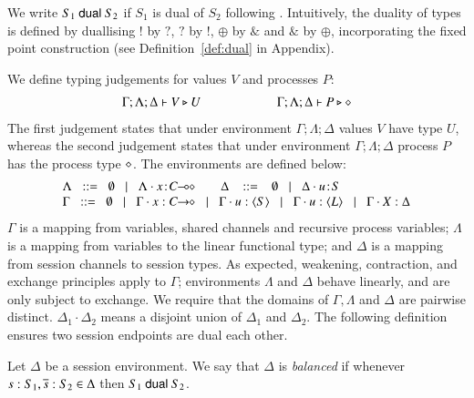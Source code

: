 We write $S_1 \ \mathsf{dual}\  S_2$ if 
$S_1$ is dual of $S_2$ following \cite{TGC14}.  
Intuitively, 
the duality of types is defined by 
duallising $!$ by $?$, $?$ by $!$, $\oplus$ by $\&$ and $\&$ by $\oplus$,  
incorporating the fixed point construction 
(see Definition~\ref{def:dual} in Appendix). 

\noi We define typing judgements for values $V$
and processes $P$:
%
\[	\begin{array}{c}
		\Gamma; \Lambda; \Delta \vdash V \triangleright U \qquad \qquad \qquad \Gamma; \Lambda; \Delta \vdash P \triangleright \diamond
	\end{array}
\]
The first judgement
states that under environment $\Gamma; \Lambda; \Delta$ values $V$
have type $U$, whereas the second judgement states that under
environment $\Gamma; \Lambda; \Delta$ process $P$ has the process type
$\diamond$. The environments are defined below:
\[
\begin{array}{l}
 \Lambda \bnfis  \emptyset \bnfbar \Lambda \cat \AT{x}{\lhot{C}}
\quad\quad \Delta  \ \bnfis  \ \emptyset \bnfbar \Delta \cat \AT{u}{S} \\
 \Gamma  \bnfis  \emptyset \bnfbar \Gamma \cat \varp{x}: \shot{C} \bnfbar \Gamma \cat u: \chtype{S} \bnfbar \Gamma \cat u: \chtype{L} 
        \bnfbar \Gamma \cat \rvar{X}: \Delta
\end{array}
\]
\noi 
$\Gamma$ is a mapping from variables, shared channels and recursive 
process variables;  $\Lambda$ is a mapping from variables to 
the linear functional type; and $\Delta$ is a mapping from 
session channels to session types. 
As expected, weakening, contraction, and exchange principles apply to
$\Gamma$; environments $\Lambda$ and $\Delta$ behave linearly, and are
only subject to exchange.  We require that the domains of $\Gamma,
\Lambda$ and $\Delta$ are pairwise distinct. $\Delta_1\cdot \Delta_2$ means 
a disjoint union of $\Delta_1$ and $\Delta_2$.  
The following definition ensures two session endpoints 
are dual each other. 

\smallskip

\begin{definition}[Balanced]\label{d:wtenv}%
	Let $\Delta$ be a session environment.
	We say that $\Delta$ is {\em balanced} if whenever
	$s: S_1, \overline{s}: S_2 \in \Delta$ then $S_1 \ \mathsf{dual}\  S_2$.
\end{definition}

